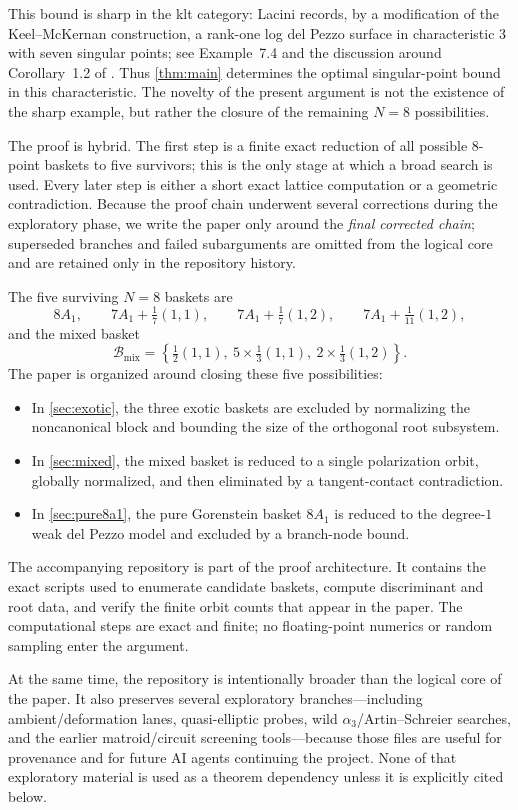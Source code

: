 \documentclass[11pt]{article}
\theoremstyle{definition}
\begin{document}
This bound is sharp in the klt category: Lacini records, by a modification of the Keel--McKernan construction, a rank-one log del Pezzo surface in characteristic $3$ with seven singular points; see Example~7.4 and the discussion around Corollary~1.2 of \cite{Lacini24}. Thus \cref{thm:main} determines the optimal singular-point bound in this characteristic. The novelty of the present argument is not the existence of the sharp example, but rather the closure of the remaining $N=8$ possibilities.

The proof is hybrid. The first step is a finite exact reduction of all possible $8$-point baskets to five survivors; this is the only stage at which a broad search is used. Every later step is either a short exact lattice computation or a geometric contradiction. Because the proof chain underwent several corrections during the exploratory phase, we write the paper only around the \emph{final corrected chain}; superseded branches and failed subarguments are omitted from the logical core and are retained only in the repository history.

The five surviving $N=8$ baskets are
\[
8A_1,
\qquad
7A_1+\tfrac17(1,1),
\qquad
7A_1+\tfrac17(1,2),
\qquad
7A_1+\tfrac1{11}(1,2),
\]
and the mixed basket
\[
\mathcal B_{\mathrm{mix}}=\left\{\tfrac12(1,1),\ 5\times\tfrac13(1,1),\ 2\times\tfrac13(1,2)\right\}.
\]
The paper is organized around closing these five possibilities:
\begin{itemize}
\item In \cref{sec:exotic}, the three exotic baskets are excluded by normalizing the noncanonical block and bounding the size of the orthogonal root subsystem.
\item In \cref{sec:mixed}, the mixed basket is reduced to a single polarization orbit, globally normalized, and then eliminated by a tangent-contact contradiction.
\item In \cref{sec:pure8a1}, the pure Gorenstein basket $8A_1$ is reduced to the degree-$1$ weak del Pezzo model and excluded by a branch-node bound.
\end{itemize}

The accompanying repository is part of the proof architecture. It contains the exact scripts used to enumerate candidate baskets, compute discriminant and root data, and verify the finite orbit counts that appear in the paper. The computational steps are exact and finite; no floating-point numerics or random sampling enter the argument.

At the same time, the repository is intentionally broader than the logical core of the paper. It also preserves several exploratory branches---including ambient/deformation lanes, quasi-elliptic probes, wild $\alpha_3$/Artin--Schreier searches, and the earlier matroid/circuit screening tools---because those files are useful for provenance and for future AI agents continuing the project. None of that exploratory material is used as a theorem dependency unless it is explicitly cited below.
\end{document}

